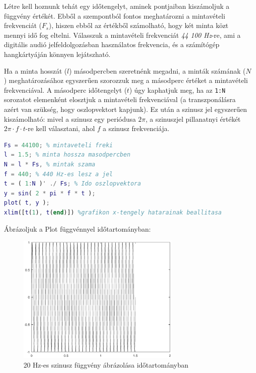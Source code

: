 \documentclass[12pt,a4paper]{article}
\begin{document}
Létre kell hoznunk tehát egy időtengelyt, aminek pontjaiban kiszámoljuk a függvény értékét. Ebből a szempontból fontos meghatározni a mintavételi frekvenciát ($F_s$), hiszen ebből az értékből számolható, hogy két minta közt mennyi idő fog eltelni. Válasszuk a mintavételi frekvenciát \textit{44 100 Hz}-re, ami a digitális audió jelfeldolgozásban használatos frekvencia, és a számítógép hangkártyáján könnyen lejátszható.

Ha a minta hosszát ($l$) másodpercben szeretnénk megadni, a minták számának ($N$) meghatározásához egyszerűen szorozzuk meg a másodperc értéket a mintavételi frekvenciával. A másodperc időtengelyt ($t$) úgy kaphatjuk meg, ha az \texttt{1:N} sorozatot elemenként elosztjuk a mintavételi frekvenciával (a transzponálásra azért van szükség, hogy oszlopvektort kapjunk). Ez után a szinusz jel egyszerűen kiszámolható: mivel a szinusz egy periódusa $2\pi$, a szinuszjel pillanatnyi értékét $2\pi \cdot f \cdot t$-re kell választani, ahol $f$ a szinusz frekvenciája.

\begin{lstlisting}[frame=single,language=matlab,caption=Mintavételi frekvencia beállítása és szinuszjel előállítása]
Fs = 44100; % mintaveteli freki
l = 1.5; % minta hossza masodpercben
N = l * Fs, % mintak szama
f = 440; % 440 Hz-es lesz a jel
t = ( 1:N )' ./ Fs; % Ido oszlopvektora
y = sin( 2 * pi * f * t );
plot( t, y );
xlim([t(1), t(end)]) %grafikon x-tengely hatarainak beallitasa
\end{lstlisting}

\clearpage
Ábrázoljuk a Plot függvénnyel időtartományban:

\begin{figure}[H]
\begin{center}
\includegraphics[width=8cm]{figures/modulaciok_workshop_szinusz.eps}
\caption{20 Hz-es szinusz függvény ábrázolása időtartományban}
\label{fig:szinusz}
\end{center}
\end{figure}
\end{document}
